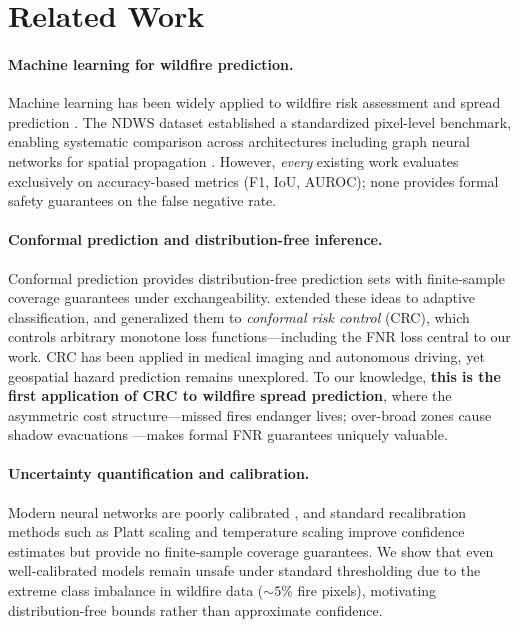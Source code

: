 \documentclass{article}
\begin{document}
\section{Related Work}

\paragraph{Machine learning for wildfire prediction.}
Machine learning has been widely applied to wildfire risk assessment and spread prediction \citep{jain2020review, radke2019firecast}.
The NDWS dataset \citep{huot2022next} established a standardized pixel-level benchmark, enabling systematic comparison across architectures including graph neural networks for spatial propagation \citep{kipf2017semi, veličković2018graph}.
However, \emph{every} existing work evaluates exclusively on accuracy-based metrics (F1, IoU, AUROC); none provides formal safety guarantees on the false negative rate.

\paragraph{Conformal prediction and distribution-free inference.}
Conformal prediction \citep{vovk2005algorithmic, shafer2008tutorial} provides distribution-free prediction sets with finite-sample coverage guarantees under exchangeability.
\citet{romano2020classification} extended these ideas to adaptive classification, and \citet{angelopoulos2022conformal} generalized them to \emph{conformal risk control} (CRC), which controls arbitrary monotone loss functions---including the FNR loss central to our work.
CRC has been applied in medical imaging and autonomous driving, yet geospatial hazard prediction remains unexplored.
To our knowledge, \textbf{this is the first application of CRC to wildfire spread prediction}, where the asymmetric cost structure---missed fires endanger lives; over-broad zones cause shadow evacuations \citep{zhao2022evacuation}---makes formal FNR guarantees uniquely valuable.

\paragraph{Uncertainty quantification and calibration.}
Modern neural networks are poorly calibrated \citep{guo2017calibration}, and standard recalibration methods such as Platt scaling \citep{platt1999probabilistic} and temperature scaling improve confidence estimates but provide no finite-sample coverage guarantees.
We show that even well-calibrated models remain unsafe under standard thresholding due to the extreme class imbalance in wildfire data (${\sim}5\%$ fire pixels), motivating distribution-free bounds rather than approximate confidence.
\end{document}
